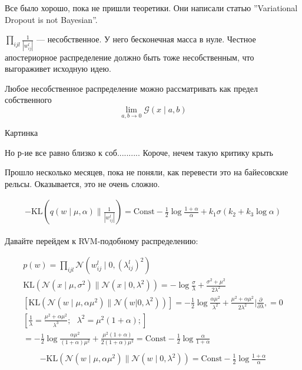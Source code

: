 \documentclass{minimal}
\begin{document}
Все было хорошо, пока не пришли теоретики. Они написали статью ''Variational Dropout is not Bayesian''.

$\prod_{ijl}^{} {\frac{1}{|w_{ij}^l|}}$ --- несобственное. У него бесконечная масса в нуле. Честное апостериорное распределение должно быть тоже несобственным, что выгораживет исходную идею.

Любое несобственное распределение можно рассматривать как предел собственного
\[
  \lim_{a,b\rightarrow 0} {\mathcal{G}(x\mid a, b)}
\]

Картинка

Но р-ие все равно близко к соб.......... Короче, нечем такую критику крыть

Прошло несколько месяцев, пока не поняли, как перевести это на байесовские рельсы.
Оказывается, это не очень сложно.

\begin{gather*}
  -\mathrm{KL}(q(w\mid \mu, \alpha)\| \frac{1}{|w_{ij}^l|})=
  \mathrm{Const}-\frac{1}{2}\log \frac{1+\alpha}{\alpha}+k_1\sigma(k_2+k_3\log\alpha)
\end{gather*}

Давайте перейдем к RVM-подобному распределению:

\begin{gather*}
  p(w)=\prod_{ijl}^{} {\mathcal{N}\left(w_{ij}^l\mid 0, (\lambda_{ij}^l)^2\right)}\\
  \mathrm{KL}\left(\mathcal{N}\left(x \mid \mu, \sigma^2\right) \| \mathcal{N}\left(x \mid 0, \lambda^2\right)\right)= -\log\frac{\sigma}{\lambda}+\frac{\sigma^2+\mu^2}{2\lambda^2}\\
  \left[\mathrm{KL}\left(\mathcal{N}\left(w \mid \mu, \alpha\mu^2\right)\|\mathcal{N}(w|0,\lambda^2)\right)\right]=
  -\frac{1}{2}\log \frac{\alpha\mu^2}{\lambda^2}+\frac{\mu^2+\alpha\mu^2}{2\lambda^2} \Bigg | \frac{\partial }{\partial \lambda},=0\\
  \left[\frac{1}{\lambda}=\frac{\mu^2+\alpha\mu^2}{\lambda^{3}};~~~\lambda^2=\mu^2(1+\alpha);\right]\\
  =-\frac{1}{2}\log \frac{\alpha\mu^2}{(1+\alpha)\mu^2}+\frac{\mu^2(1+\alpha)}{2(1+\alpha)\mu^2}=\mathrm{Const}-\frac{1}{2}\log \frac{\alpha}{1+\alpha}\\
\end{gather*}
\begin{gather*}
  -\mathrm{KL}(\mathcal{N}\left(w\mid \mu, \alpha\mu^2\right)\|\mathcal{N}\left(w\mid 0, \lambda^2\right))=\mathrm{Const}-\frac{1}{2}\log\frac{1+\alpha}{\alpha}
\end{gather*}
\end{document}
